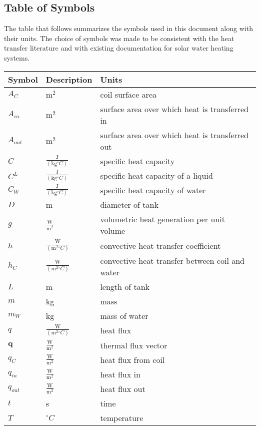 \documentclass[12pt]{article}
\begin{document}
\subsection{Table of Symbols}
\label{Sec:ToS}
The table that follows summarizes the symbols used in this document along with their units. The choice of symbols was made to be consistent with the heat transfer literature and with existing documentation for solar water heating systems.
\begin{longtable*}{l l l}
\toprule
Symbol & Description & Units
\\
\midrule
$A_{C}$ & $\text{m}^{2}$ & coil surface area
\\
$A_{in}$ & $\text{m}^{2}$ & surface area over which heat is transferred in
\\
$A_{out}$ & $\text{m}^{2}$ & surface area over which heat is transferred out
\\
$C$ & $\frac{\text{J}}{(\text{kg}{}^{\circ}C)}$ & specific heat capacity
\\
$C^{L}$ & $\frac{\text{J}}{(\text{kg}{}^{\circ}C)}$ & specific heat capacity of a liquid
\\
$C_{W}$ & $\frac{\text{J}}{(\text{kg}{}^{\circ}C)}$ & specific heat capacity of water
\\
$D$ & m & diameter of tank
\\
$g$ & $\frac{\text{W}}{\text{m}^{2}}$ & volumetric heat generation per unit volume
\\
$h$ & $\frac{\text{W}}{(\text{m}^{2}{}^{\circ}C)}$ & convective heat transfer coefficient
\\
$h_{C}$ & $\frac{\text{W}}{(\text{m}^{2}{}^{\circ}C)}$ & convective heat transfer between coil and water
\\
$L$ & m & length of tank
\\
$m$ & kg & mass
\\
$m_{W}$ & kg & mass of water
\\
$q$ & $\frac{\text{W}}{(\text{m}^{2}{}^{\circ}C)}$ & heat flux
\\
$\mathbf{q}$ & $\frac{\text{W}}{\text{m}^{2}}$ & thermal flux vector
\\
$q_{C}$ & $\frac{\text{W}}{\text{m}^{2}}$ & heat flux from coil
\\
$q_{in}$ & $\frac{\text{W}}{\text{m}^{2}}$ & heat flux in
\\
$q_{out}$ & $\frac{\text{W}}{\text{m}^{2}}$ & heat flux out
\\
$t$ & s & time
\\
$T$ & ${}^{\circ}C$ & temperature

\end{longtable*}
\end{document}
